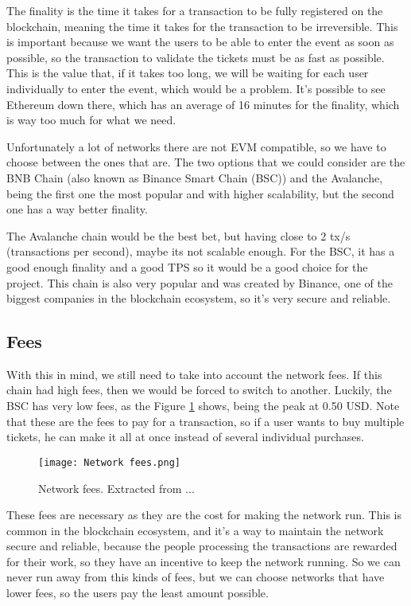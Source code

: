 The finality is the time it takes for a transaction to be fully registered on the blockchain, meaning the time it takes for the transaction to be irreversible. This is important because we want the users to be able to enter the event as soon as possible, so the transaction to validate the tickets must be as fast as possible. This is the value that, if it takes too long, we will be waiting for each user individually to enter the event, which would be a problem. It's possible to see Ethereum down there, which has an average of 16 minutes for the finality, which is way too much for what we need.

Unfortunately a lot of networks there are not EVM compatible, so we have to choose between the ones that are. The two options that we could consider are the BNB Chain (also known as Binance Smart Chain (BSC)) and the Avalanche, being the first one the most popular and with higher scalability, but the second one has a way better finality.

The Avalanche chain would be the best bet, but having close to 2 tx/s (transactions per second), maybe its not scalable enough. For the BSC, it has a good enough finality and a good TPS so it would be a good choice for the project. This chain is also very popular and was created by Binance, one of the biggest companies in the blockchain ecosystem, so it's very secure and reliable.

\subsection{Fees}
\label{subsec:fees}

With this in mind, we still need to take into account the network fees. If this chain had high fees, then we would be forced to switch to another. Luckily, the BSC has very low fees, as the Figure \ref{fig:network_fees} shows, being the peak at 0.50 USD. Note that these are the fees to pay for a transaction, so if a user wants to buy multiple tickets, he can make it all at once instead of several individual purchases.

\begin{figure}[H]
    \texttt{[image: Network fees.png]}
    \centering
    \caption{Network fees. Extracted from ...}
    \label{fig:network_fees}
\end{figure}

These fees are necessary as they are the cost for making the network run. This is common in the blockchain ecosystem, and it's a way to maintain the network secure and reliable, because the people processing the transactions are rewarded for their work, so they have an incentive to keep the network running. So we can never run away from this kinds of fees, but we can choose networks that have lower fees, so the users pay the least amount possible.

